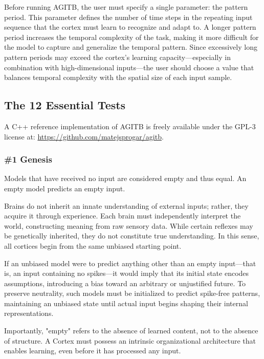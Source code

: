 \documentclass{article}
\newenvironment{two_assertions}[2]
{
  \begin{tabular}{p{1.5cm}p{8.2cm}}
    \textbf{Assertion:} & #1 \\
    \textbf{Assertion:} & #2 \\
}{
  \end{tabular}\\
}
\begin{document}
Before running AGITB, the user must specify a single parameter: the pattern period. This parameter defines the number of time steps in the repeating input sequence that the cortex must learn to recognize and adapt to. A longer pattern period increases the temporal complexity of the task, making it more difficult for the model to capture and generalize the temporal pattern. Since excessively long pattern periods may exceed the cortex’s learning capacity—especially in combination with high-dimensional inputs—the user should choose a value that balances temporal complexity with the spatial size of each input sample.

\subsection{The 12 Essential Tests}

A C++ reference implementation of AGITB is freely available under the GPL-3 license at: \url{https://github.com/matejsprogar/agitb}.

\subsubsection*{\#1 Genesis}
\begin{two_assertions}
    {Models that have received no input are considered empty and thus equal.}
    {An empty model predicts an empty input.}
\end{two_assertions}

Brains do not inherit an innate understanding of external inputs; rather, they acquire it through experience. Each brain must independently interpret the world, constructing meaning from raw sensory data. While certain reflexes may be genetically inherited, they do not constitute true understanding. In this sense, all cortices begin from the same unbiased starting point.

If an unbiased model were to predict anything other than an empty input—that is, an input containing no spikes—it would imply that its initial state encodes assumptions, introducing a bias toward an arbitrary or unjustified future. To preserve neutrality, such models must be initialized to predict spike-free patterns, maintaining an unbiased state until actual input begins shaping their internal representations.

Importantly, "empty" refers to the absence of learned content, not to the absence of structure. A Cortex must possess an intrinsic organizational architecture that enables learning, even before it has processed any input.
\end{document}
